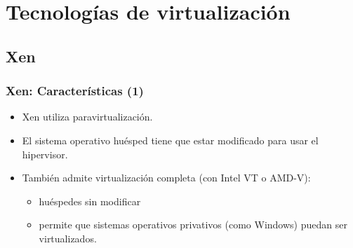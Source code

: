 \documentclass{beamer}
\begin{document}
\section{Tecnologías de virtualización}


\subsection{Xen}


\begin{frame}
\frametitle{Xen: Características (1)}

\begin{itemize}
\item Xen utiliza \alert{paravirtualización}.
\item El sistema operativo huésped tiene que estar modificado para usar el hipervisor.
\item También admite virtualización completa (con Intel VT o AMD-V): 
	\begin{itemize}
	\item huéspedes sin modificar 
	\item permite que sistemas operativos privativos (como Windows) puedan ser virtualizados.
	\end{itemize}
\end{itemize}

\end{frame}

\end{document}
